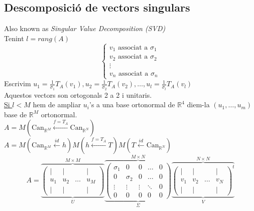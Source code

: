 \documentclass[../main.tex]{subfiles}
\begin{document}
    \subsection{Descomposició de vectors singulars}
    Also known as \textit{Singular Value Decomposition (SVD)}
    \\Tenint $l=rang(A)$
    \begin{displaymath}
        \begin{cases}
            v_1\text{ associat a } \sigma_1\\
            v_2\text{ associat a } \sigma_2\\
            \vdots\\
            v_n\text{ associat a } \sigma_n
        \end{cases}
    \end{displaymath}
    Escrivim $u_1 = \frac{1}{\sigma_1}T_A(v_1), u_2 = \frac{1}{\sigma_2}T_A(v_2), \dots, u_l = \frac{1}{\sigma_l}T_A(v_l)$\\
    Aquestos vectors son ortogonals 2 a 2 i unitaris.\\
    \underline{Si $l < M$} hem de ampliar $u_i$'s a una base ortonormal de $\mathbb{R}^4$ diem-la $(u_1, \dots, u_m)$ base de $\mathbb{R}^M$ ortonormal.\\
    $A = M(\text{Can}_{\mathbb{R}^M} \xleftarrow{f = T_A} \text{Can}_{\mathbb{R}^N})$\\
    $A = M(\text{Can}_{\mathbb{R}^M} \xleftarrow{id} h) M(h \xleftarrow{f = T_A} T) M(T \xleftarrow{id} \text{Can}_{\mathbb{R}^N})$\\
    \begin{displaymath}
        A = \overbrace{\underbrace{\begin{pmatrix}| & | &  & |\\u_1 & u_2 & \dots & u_M\\| & | & & |\end{pmatrix}}_{U}}^{M\times M} \overbrace{\underbrace{\begin{pmatrix}\sigma_1 & 0 & 0 & \dots & 0\\0 & \sigma_2 & 0 & \dots & 0\\\vdots & \vdots & \vdots & \ddots & 0\\0 & 0 & 0 & 0 & 0\end{pmatrix}}_{\Sigma}}^{M\times N} \overbrace{\underbrace{\begin{pmatrix}| & | &  & |\\v_1 & v_2 & \dots & v_N\\| & | & & |\end{pmatrix}^t}_{V}}^{N\times N}
    \end{displaymath}
\end{document}
